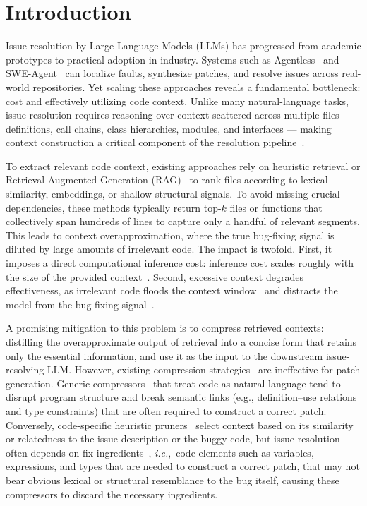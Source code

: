 \documentclass[sigconf,nonacm]{acmart}
\newcommand{\ie}{\textit{i.e.},~}
\begin{document}
\section{Introduction}

Issue resolution by Large Language Models (LLMs) has progressed from academic prototypes to practical adoption in industry. Systems such as Agentless~\cite{xia2024agentless} and SWE-Agent~\cite{DBLP:conf/nips/YangJWLYNP24} can localize faults, synthesize patches, and resolve issues across real-world repositories. Yet scaling these approaches reveals a fundamental bottleneck: cost and effectively utilizing code context. Unlike many natural-language tasks, issue resolution requires reasoning over context scattered across multiple files --- definitions, call chains, class hierarchies, modules, and interfaces --- making context construction a critical component of the resolution pipeline~\cite{li2026contextbench}.
  
To extract relevant code context, existing approaches rely on heuristic retrieval or Retrieval-Augmented Generation (RAG)~\cite{lewis2020retrieval} to rank files according to lexical similarity, embeddings, or shallow structural signals. To avoid missing crucial dependencies, these methods typically return top-$k$ files or functions that collectively span hundreds of lines to capture only a handful of relevant segments. This leads to context overapproximation, where the true bug-fixing signal is diluted by large amounts of irrelevant code. The impact is twofold. First, it imposes a direct computational inference cost: inference cost scales roughly with the size of the provided context~\cite{DBLP:conf/nips/VaswaniSPUJGKP17}. Second, excessive context degrades effectiveness, as irrelevant code floods the context window~\cite{liu2024lost} and distracts the model from the bug-fixing signal~\cite{shi2023large}.

A promising mitigation to this problem is to compress retrieved contexts: distilling the overapproximate output of retrieval into a concise form that retains only the essential information, and use it as the input to the downstream issue-resolving LLM. However, existing compression strategies~\cite{li2025prompt} are ineffective for patch generation. Generic compressors~\cite{jiang2024longllmlingua} that treat code as natural language tend to disrupt program structure and break semantic links (e.g., definition–use relations and type constraints) that are often required to construct a correct patch. Conversely, code-specific heuristic pruners~\cite{shi2025longcodezip,wang2026swe} select context based on its similarity or relatedness to the issue description or the buggy code, but issue resolution often depends on fix ingredients~\cite{martinez2014fix,liu2018lsrepair,white2019sorting}, \ie code elements such as variables, expressions, and types that are needed to construct a correct patch, that may not bear obvious lexical or structural resemblance to the bug itself, causing these compressors to discard the necessary ingredients.
\end{document}
